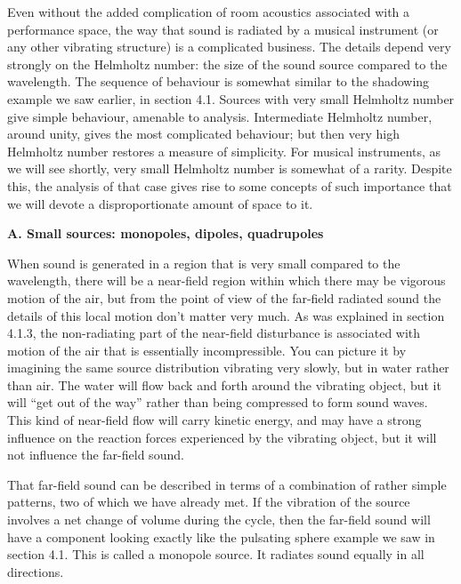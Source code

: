 

  Even without the added complication of room acoustics associated with a 
  performance space, the way that sound is radiated by a musical instrument (or 
  any other vibrating structure) is a complicated business. The details depend 
  very strongly on the Helmholtz number: the size of the sound source compared 
  to the wavelength. The sequence of behaviour is somewhat similar to the 
  shadowing example we saw earlier, in section 4.1. Sources with very small 
  Helmholtz number give simple behaviour, amenable to analysis. Intermediate 
  Helmholtz number, around unity, gives the most complicated behaviour; but 
  then very high Helmholtz number restores a measure of simplicity. For musical 
  instruments, as we will see shortly, very small Helmholtz number is somewhat 
  of a rarity. Despite this, the analysis of that case gives rise to some 
  concepts of such importance that we will devote a disproportionate amount of 
  space to it. 

  \textbf{A. Small sources: monopoles, dipoles, quadrupoles} 

  When sound is generated in a region that is very small compared to the 
  wavelength, there will be a near-field region within which there may be 
  vigorous motion of the air, but from the point of view of the far-field 
  radiated sound the details of this local motion don't matter very much. As 
  was explained in section 4.1.3, the non-radiating part of the near-field 
  disturbance is associated with motion of the air that is essentially 
  incompressible. You can picture it by imagining the same source distribution 
  vibrating very slowly, but in water rather than air. The water will flow back 
  and forth around the vibrating object, but it will ``get out of the way'' 
  rather than being compressed to form sound waves. This kind of near-field 
  flow will carry kinetic energy, and may have a strong influence on the 
  reaction forces experienced by the vibrating object, but it will not 
  influence the far-field sound. 

  That far-field sound can be described in terms of a combination of rather 
  simple patterns, two of which we have already met. If the vibration of the 
  source involves a net change of volume during the cycle, then the far-field 
  sound will have a component looking exactly like the pulsating sphere example 
  we saw in section 4.1. This is called a monopole source. It radiates sound 
  equally in all directions. 

